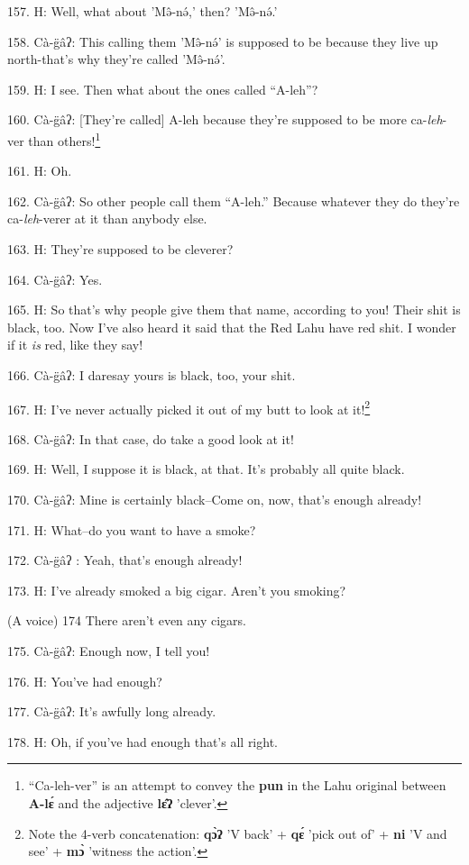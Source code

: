 157. H: Well, what about 'Mə̂-nə́,' then? 'Mə̂-nə́.'

158. Cà-g̈âʔ: This calling them 'Mə̂-nə́' is supposed to be because they
live up north-that's why they're called 'Mə̂-nə́'.

159. H: I see. Then what about the ones called ``A-leh''?

160. Cà-g̈âʔ: [They're called] A-leh because they're supposed to be more ca-\textit{leh}-ver
than others!\footnote{``Ca-leh-ver'' is an attempt to convey the \textbf{pun} in the Lahu original between \textbf{A-lɛ́} and the adjective \textbf{lɛ̂ʔ} 'clever'.}

161. H: Oh.

162. Cà-g̈âʔ: So other people call them ``A-leh.'' Because
whatever they do they're ca-\textit{leh}-verer at it than anybody else.

163. H: They're supposed to be cleverer?

164. Cà-g̈âʔ: Yes.

165. H: So that's why people give them that name, according to you! Their shit is
black, too. Now I've also heard it said that the Red Lahu have red shit. I wonder
if it \textit{is }red, like they say!

166. Cà-g̈âʔ: I daresay yours is black, too, your shit.

167. H: I've never actually picked it out of my butt to look at it!\footnote{Note the 4-verb concatenation: \textbf{qɔ̀ʔ} 'V back' + \textbf{qɛ́} 'pick out of' + \textbf{ni} 'V and see' + \textbf{mɔ̀} 'witness the action'.}

\begin{center}
\end{center}

168. Cà-g̈âʔ: In that case, do take a good look at it!

169. H: Well, I suppose it is black, at that. It's probably all quite black.

170. Cà-g̈âʔ: Mine is certainly black--Come on, now, that's enough already!

171. H: What--do you want to have a smoke?

172. Cà-g̈âʔ : Yeah, that's enough already!

173. H: I've already smoked a big cigar. Aren't you smoking?

(A voice) 174 There aren't even any cigars.

175. Cà-g̈âʔ: Enough now, I tell you!

176. H: You've had enough?

177. Cà-g̈âʔ: It's awfully long already.

178. H: Oh, if you've had enough that's all right.

